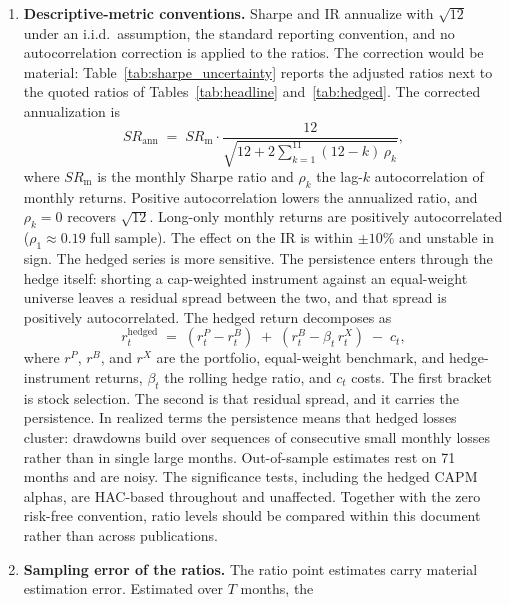 \documentclass[11pt,a4paper]{article}
\begin{document}
\begin{enumerate}
  replacement on the equal-weight book; the smaller rebalancing trades that
  restore equal weights within continuing positions are not charged.
  Table~\ref{tab:headline} therefore reports the break-even costs of
  roughly 370\,bps (MP) and 490\,bps (MI), and readers may impose their
  own assumption.
  \item \textbf{Descriptive-metric conventions.} Sharpe and IR annualize
  with $\sqrt{12}$ under an i.i.d.\ assumption, the standard reporting
  convention, and no autocorrelation correction \citep{lo2002} is applied
  to the ratios. The correction would be material:
  Table~\ref{tab:sharpe_uncertainty} reports the adjusted ratios next to
  the quoted ratios of Tables~\ref{tab:headline} and~\ref{tab:hedged}.
  The corrected annualization is
  \[
    SR_{\mathrm{ann}} \;=\; SR_{\mathrm{m}}
      \cdot \frac{12}{\sqrt{12 + 2\sum_{k=1}^{11} (12-k)\,\rho_k}},
  \]
  where $SR_{\mathrm{m}}$ is the monthly Sharpe ratio and $\rho_k$ the
  lag-$k$ autocorrelation of monthly returns. Positive autocorrelation
  lowers the annualized ratio, and $\rho_k = 0$ recovers $\sqrt{12}$.
  Long-only monthly returns are positively autocorrelated
  ($\rho_1 \approx 0.19$ full sample). The effect on the IR is within
  $\pm 10\%$ and unstable in sign. The hedged series is more sensitive.
  The persistence enters through the hedge itself: shorting a
  cap-weighted instrument against an equal-weight universe leaves a
  residual spread between the two, and that spread is positively
  autocorrelated. The hedged return decomposes as
  \[
    r^{\mathrm{hedged}}_t \;=\;
    (r^{P}_t - r^{B}_t) \;+\; (r^{B}_t - \beta_t\, r^{X}_t) \;-\; c_t,
  \]
  where $r^{P}$, $r^{B}$, and $r^{X}$ are the portfolio, equal-weight
  benchmark, and hedge-instrument returns, $\beta_t$ the rolling hedge
  ratio, and $c_t$ costs. The first bracket is stock selection. The
  second is that residual spread, and it carries the persistence.
  In realized terms the persistence means that hedged losses cluster:
  drawdowns build over sequences of consecutive small monthly losses
  rather than in single large months. Out-of-sample
  estimates rest on 71 months and are noisy. The significance tests, including the hedged CAPM
  alphas, are HAC-based throughout and unaffected. Together with the zero
  risk-free convention, ratio levels should be compared within this
  document rather than across publications.
  \item \textbf{Sampling error of the ratios.} The ratio point estimates
  carry material estimation error. Estimated over $T$ months, the

\end{enumerate}
\end{document}
